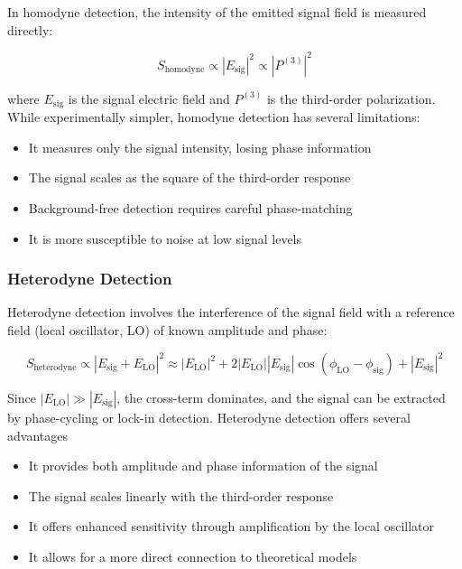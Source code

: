 \noindent In homodyne detection, the intensity of the emitted signal field is measured directly:

\begin{equation}
    S_{\text{homodyne}} \propto |E_{\text{sig}}|^2 \propto |P^{(3)}|^2
    \label{eq:homodyne}
\end{equation}

\noindent where $E_{\text{sig}}$ is the signal electric field and $P^{(3)}$ is the third-order polarization. While experimentally simpler, homodyne detection has several limitations:

\begin{itemize}
    \item It measures only the signal intensity, losing phase information
    \item The signal scales as the square of the third-order response
    \item Background-free detection requires careful phase-matching
    \item It is more susceptible to noise at low signal levels
\end{itemize}

\subsubsection{Heterodyne Detection}
\label{subsubsec:heterodyne}

\noindent Heterodyne detection involves the interference of the signal field with a reference field (local oscillator, LO) of known amplitude and phase:

\begin{equation}
    S_{\text{heterodyne}} \propto |E_{\text{sig}} + E_{\text{LO}}|^2 \approx |E_{\text{LO}}|^2 + 2|E_{\text{LO}}||E_{\text{sig}}|\cos(\phi_{\text{LO}} - \phi_{\text{sig}}) + |E_{\text{sig}}|^2
    \label{eq:heterodyne}
\end{equation}

\noindent Since $|E_{\text{LO}}| \gg |E_{\text{sig}}|$, the cross-term dominates, and the signal can be extracted by phase-cycling or lock-in detection. Heterodyne detection offers several advantages %

\begin{itemize}
    \item It provides both amplitude and phase information of the signal
    \item The signal scales linearly with the third-order response
    \item It offers enhanced sensitivity through amplification by the local oscillator
    \item It allows for a more direct connection to theoretical models
\end{itemize}


